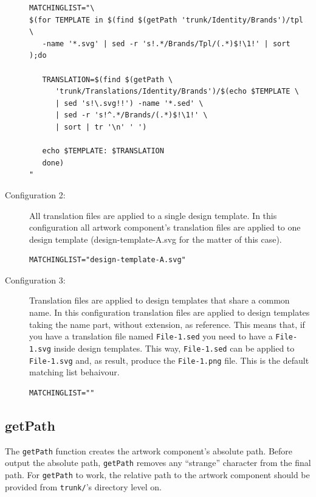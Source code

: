 \begin{description}
\begin{verbatim}
MATCHINGLIST="\
$(for TEMPLATE in $(find $(getPath 'trunk/Identity/Brands')/tpl \
   -name '*.svg' | sed -r 's!.*/Brands/Tpl/(.*)$!\1!' | sort );do

   TRANSLATION=$(find $(getPath \
      'trunk/Translations/Identity/Brands')/$(echo $TEMPLATE \
      | sed 's!\.svg!!') -name '*.sed' \
      | sed -r 's!^.*/Brands/(.*)$!\1!' \
      | sort | tr '\n' ' ')

   echo $TEMPLATE: $TRANSLATION
   done)
"
\end{verbatim}

\item[Configuration 2:] All translation files are applied to a single
design template.  In this configuration all artwork component's
translation files are applied to one design template
(design-template-A.svg for the matter of this case).

\begin{verbatim}
MATCHINGLIST="design-template-A.svg"
\end{verbatim}

\item[Configuration 3:] Translation files are applied to design
templates that share a common name. In this configuration translation
files are applied to design templates taking the name part, without
extension, as reference.  This means that, if you have a translation
file named \texttt{File-1.sed} you need to have a \texttt{File-1.svg}
inside design templates. This way, \texttt{File-1.sed} can be applied
to \texttt{File-1.svg} and, as result, produce the \texttt{File-1.png}
file.  This is the default matching list behaivour.

\begin{verbatim}
MATCHINGLIST=""
\end{verbatim}

\end{description}

\subsection{getPath}

The \texttt{getPath} function creates the artwork component's absolute
path. Before output the absolute path, \texttt{getPath} removes any
``strange'' character from the final path. For \texttt{getPath} to
work, the relative path to the artwork component should be provided
from \texttt{trunk/}'s directory level on.
